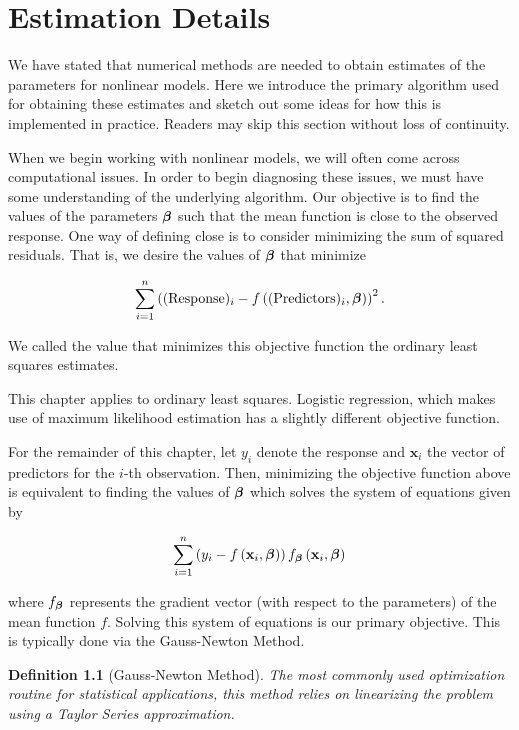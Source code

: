 \documentclass[
]{book}
\theoremstyle{plain}
\theoremstyle{mydefn}
\newtheorem{definition}{Definition}[chapter]
\theoremstyle{myexmpl}
\theoremstyle{remark}
\begin{document}
\hypertarget{nlm-estimation}{%
\chapter{Estimation Details}\label{nlm-estimation}}

We have stated that numerical methods are needed to obtain estimates of the parameters for nonlinear models. Here we introduce the primary algorithm used for obtaining these estimates and sketch out some ideas for how this is implemented in practice. Readers may skip this section without loss of continuity.

When we begin working with nonlinear models, we will often come across computational issues. In order to begin diagnosing these issues, we must have some understanding of the underlying algorithm. Our objective is to find the values of the parameters \(\boldsymbol{\beta}\) such that the mean function is close to the observed response. One way of defining close is to consider minimizing the sum of squared residuals. That is, we desire the values of \(\boldsymbol{\beta}\) that minimize

\[\sum_{i=1}^{n} \left((\text{Response})_i - f\left((\text{Predictors})_i, \boldsymbol{\beta}\right)\right)^2.\]

We called the value that minimizes this objective function the ordinary least squares estimates.

\begin{rmdwarning}
This chapter applies to ordinary least squares. Logistic regression, which makes use of maximum likelihood estimation has a slightly different objective function.\\
\end{rmdwarning}

For the remainder of this chapter, let \(y_i\) denote the response and \(\bm{x}_i\) the vector of predictors for the \(i\)-th observation. Then, minimizing the objective function above is equivalent to finding the values of \(\boldsymbol{\beta}\) which solves the system of equations given by

\[\sum_{i=1}^{n} \left(y_i - f\left(\mathbf{x}_i, \boldsymbol{\beta}\right)\right) f_{\boldsymbol{\beta}}\left(\mathbf{x}_i, \boldsymbol{\beta}\right)\]

where \(f_{\boldsymbol{\beta}}\) represents the gradient vector (with respect to the parameters) of the mean function \(f\). Solving this system of equations is our primary objective. This is typically done via the Gauss-Newton Method.

\begin{definition}[Gauss-Newton Method]
\protect\hypertarget{def:defn-gauss-newton}{}{\label{def:defn-gauss-newton} {} }The most commonly used optimization routine for statistical applications, this method relies on linearizing the problem using a Taylor Series approximation.
\end{definition}
\end{document}
